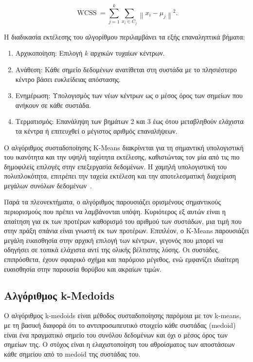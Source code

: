 \begin{equation}
\operatorname{WCSS} = \sum_{j=1}^{k} \sum_{x_i \in C_j} \left\| x_i - \mu_j \right\|^2.
\label{eq:kmeans-wcss}
\end{equation}

Η διαδικασία εκτέλεσης του αλγορίθμου περιλαμβάνει τα εξής επαναληπτικά βήματα:

\begin{enumerate}
    \item Αρχικοποίηση: Επιλογή $k$ αρχικών τυχαίων κέντρων.
    
    \item Ανάθεση: Κάθε σημείο δεδομένων ανατίθεται στη συστάδα με το πλησιέστερο κέντρο βάσει ευκλείδειας απόστασης.
    
    \item Ενημέρωση: Υπολογισμός των νέων κέντρων ως ο μέσος όρος των σημείων που ανήκουν σε κάθε συστάδα.
    
    \item Τερματισμός: Επανάληψη των βημάτων 2 και 3 έως ότου μεταβληθούν ελάχιστα τα κέντρα ή επιτευχθεί ο μέγιστος αριθμός επαναλήψεων.
\end{enumerate}

Ο αλγόριθμος συσταδοποίησης K-Means διακρίνεται για τη σημαντική υπολογιστική του ικανότητα και την υψηλή ταχύτητα εκτέλεσης, καθιστώντας τον μία από τις πιο δημοφιλείς επιλογές στην επεξεργασία δεδομένων. Η χαμηλή υπολογιστική του πολυπλοκότητα, επιτρέπει την ταχεία εκτέλεση και την αποτελεσματική διαχείριση μεγάλων συνόλων δεδομένων~\cite{macqueen1967some}.

Παρά τα πλεονεκτήματα, ο αλγόριθμος παρουσιάζει ορισμένους σημαντικούς περιορισμούς που πρέπει να λαμβάνονται υπόψη. Κυριότερος εξ αυτών είναι η απαίτηση για εκ των προτέρων καθορισμό του αριθμού των συστάδων, μια τιμή που στην πράξη σπάνια είναι γνωστή εκ των προτέρων. Επιπλέον, ο K-Means παρουσιάζει μεγάλη ευαισθησία στην αρχική επιλογή των κέντρων, γεγονός που μπορεί να οδηγήσει  σε τοπικά ελάχιστα αντί της ολικής βέλτιστης λύσης. Οι συστάδες, επιπρόσθετα, έχουν σφαιρικό σχήμα και παρόμοιο μέγεθος, ενώ εμφανίζει ιδιαίτερη ευαισθησία στην παρουσία θορύβου και ακραίων τιμών.

\subsection{Αλγόριθμος k-Medoids}

Ο αλγόριθμος k-medoids είναι μέθοδος συσταδοποίησης παρόμοια με τον k-means, με τη βασική διαφορά ότι το αντιπροσωπευτικό στοιχείο κάθε συστάδας (medoid) είναι ένα πραγματικό σημείο του συνόλου δεδομένων και όχι ο μέσος όρος των σημείων της. Ο στόχος είναι η ελαχιστοποίηση του αθροίσματος των αποστάσεων κάθε σημείου από το medoid της συστάδας του.

